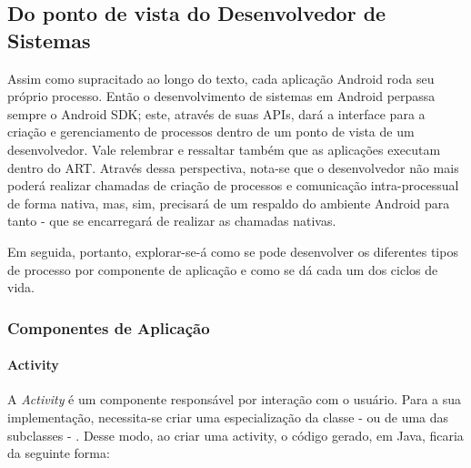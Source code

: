 \documentclass[12pt, a4paper]{article}
\newcommand{\tit}[1]{\textit{#1}}
\begin{document}
    
    
        
    
    \subsection{Do ponto de vista do Desenvolvedor de Sistemas}
    Assim como supracitado ao longo do texto, cada aplicação Android roda seu próprio processo. Então o desenvolvimento de sistemas em Android perpassa sempre o Android SDK; este, através de suas APIs, dará a interface para a criação e gerenciamento de processos dentro de um ponto de vista de um desenvolvedor. Vale relembrar e ressaltar também que as aplicações executam dentro do ART. Através dessa perspectiva, nota-se que o desenvolvedor não mais poderá realizar chamadas de criação de processos e comunicação intra-processual de forma nativa, mas, sim, precisará de um respaldo do ambiente Android para tanto - que se encarregará de realizar as chamadas nativas.
    
    
    Em seguida, portanto, explorar-se-á como se pode desenvolver os diferentes tipos de processo por componente de aplicação e como se dá cada um dos ciclos de vida.
    
    \subsubsection{Componentes de Aplicação}
    \paragraph{Activity}
        A \tit{Activity} é um componente responsável por interação com o usuário. Para a sua implementação, necessita-se criar uma especialização da classe - ou de uma das subclasses -  .\cite{android:intro-activities}
        Desse modo, ao criar uma activity, o código gerado, em Java, ficaria da seguinte forma:
        
\end{document}
